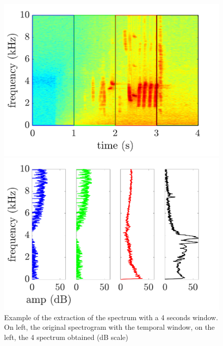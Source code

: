\documentclass[twocolumn,a4paper,10pt]{article}
\begin{document}
\begin{figure}[!t]
\centering
	\begin{minipage}[t]{.24\textwidth}
		\centering
		\includegraphics[width=\linewidth]{../image/extractionDictionary1Example.pdf} 
	\end{minipage}
	\begin{minipage}[t]{.24\textwidth}
		\centering
		\includegraphics[width=\linewidth]{../image/extractionDictionary2Example.pdf} 
	\end{minipage}
	\caption{Example of the extraction of the spectrum with a 4 seconds window. On left, the original spectrogram with the temporal window, on the left, the 4 spectrum obtained (dB scale)}
	\label{fig:dictionaryExtraction}
\end{figure}
\end{document}
